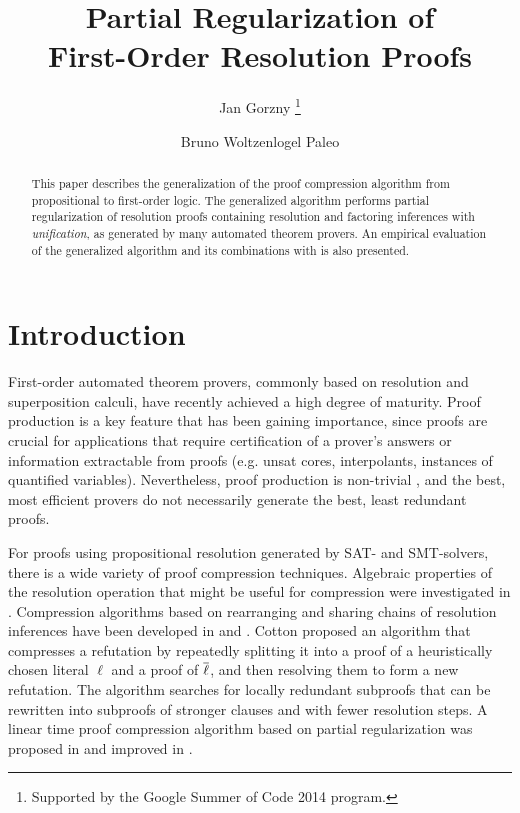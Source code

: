 \documentclass{llncs}
\title{Partial Regularization of\\ First-Order Resolution Proofs}
\author{
  Jan Gorzny\inst{1}
  \thanks{Supported by the Google Summer of Code 2014 program.}
  \and 
  Bruno Woltzenlogel Paleo\inst{2,3}
}
\institute{
  \email{jgorzny@uvic.ca}, University of Victoria, Canada
  \and 
  \email{bruno@logic.at}, Vienna University of Technology, Austria
  \and 
  Australian National University
}
\begin{document}
\maketitle


\begin{abstract}
This paper describes the generalization of the 
proof compression algorithm
\RecyclePivotsIntersection 
from propositional to first-order logic. The generalized algorithm performs partial regularization of resolution proofs containing resolution and factoring inferences with \emph{unification}, as generated by many automated theorem provers. An empirical evaluation of the generalized algorithm and its combinations with \SFOLowerUnits is also presented.
\end{abstract}


\setcounter{footnote}{0}

\section{Introduction} 

First-order automated theorem provers, commonly based on resolution and superposition calculi, have recently achieved a high degree of maturity. Proof production is a key feature that has been gaining importance, since proofs are crucial for applications that require certification of a prover's answers or information extractable from proofs (e.g. unsat cores, interpolants, instances of quantified variables). Nevertheless, proof production is non-trivial%
, and the best, most efficient provers do not necessarily generate the best, least redundant proofs.

For proofs using propositional resolution generated by SAT- and SMT-solvers, there is a wide variety of proof compression techniques. Algebraic properties of the resolution operation that might be useful for compression were investigated in \cite{bwp10}.
Compression algorithms based on rearranging and sharing chains of resolution inferences have been
developed in \cite{Amjad07} and \cite{Sinz}.  Cotton \cite{CottonSplit} proposed an algorithm that
compresses a refutation by repeatedly splitting it into a proof of a heuristically chosen literal $\ell$
and a proof of $\overline{\ell}$, and then resolving them to form a new refutation.  The {\ReduceReconstruct} algorithm \cite{RedRec} searches for locally redundant
subproofs that can be rewritten into subproofs of stronger clauses and with fewer resolution steps.
A linear time proof compression algorithm based on partial
regularization was proposed in \cite{RP08} and improved in \cite{LURPI}.
\end{document}
